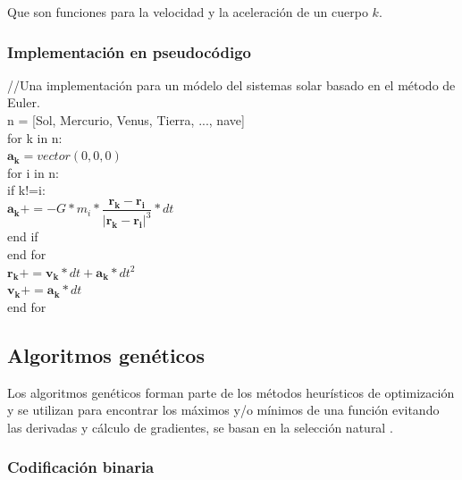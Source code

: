 \documentclass[12pt,letterpaper]{article}
\begin{document}
Que son funciones para la velocidad y la aceleración de un cuerpo $k$.

\subsubsection*{Implementación en pseudocódigo}
//Una implementación para un módelo del sistemas solar basado en el método de Euler. \\
\hspace*{0.65cm}n = [Sol, Mercurio, Venus, Tierra, ..., nave] \\
\hspace*{0.5cm} for k in n: \\
\hspace*{1cm} $\mathbf{a_k} = vector(0,0,0)$ \\
\hspace*{1cm} for i in n: \\
\hspace*{1.5cm} if k!=i: \\
\hspace*{2cm} $\mathbf{a_{k}} +=  - G * m_i * \dfrac{\mathbf{r_{k}}-\mathbf{r_i}}{|\mathbf{r_{k}}-\mathbf{r_i}|^3} * dt$ \\ 
\hspace*{1.65cm}end if \\
\hspace*{1cm} end for\\
\hspace*{1.1cm}$ \mathbf{r_{k}} +=  \mathbf{v_{k}} * dt + \mathbf{a_{k}} *  dt ^2 $ \\
\hspace*{1.1cm}$ \mathbf{v_{k}} +=   \mathbf{a_{k}} * dt  $ \\
\hspace*{0.6cm} end for 

\subsection*{Algoritmos genéticos}

Los algoritmos genéticos forman parte de los métodos heurísticos de optimización y se utilizan para encontrar los máximos y/o mínimos de una función evitando las derivadas y cálculo de  gradientes, se basan en la selección natural \citep{gestal2010introduccion}.

\subsubsection*{Codificación binaria}
\end{document}
